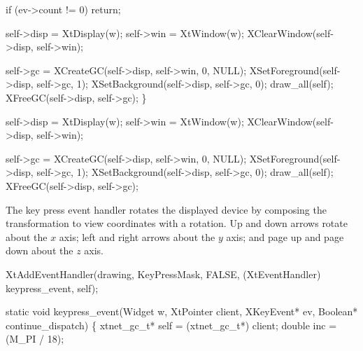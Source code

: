     if (ev->count != 0)
        return;

    self->disp = XtDisplay(w);
    self->win  = XtWindow(w);
    XClearWindow(self->disp, self->win);

    self->gc = XCreateGC(self->disp, self->win, 0, NULL);
    XSetForeground(self->disp, self->gc, 1);
    XSetBackground(self->disp, self->gc, 0);
    draw_all(self);
    XFreeGC(self->disp, self->gc);
\}

\nwendcode{}\nwdocspar

\nwenddocs{}\endmoddef\nwstartdeflinemarkup{}\nwenddeflinemarkup
self->disp = XtDisplay(w);
self->win  = XtWindow(w);
XClearWindow(self->disp, self->win);

self->gc = XCreateGC(self->disp, self->win, 0, NULL);
XSetForeground(self->disp, self->gc, 1);
XSetBackground(self->disp, self->gc, 0);
draw_all(self);
XFreeGC(self->disp, self->gc);
\nwendcode{}\nwdocspar

The key press event handler rotates the displayed device by
composing the transformation to view coordinates with a
rotation.  Up and down arrows rotate about the $x$ axis;
left and right arrows about the $y$ axis; and page up and
page down about the $z$ axis.

\nwenddocs{}\plusendmoddef\nwstartdeflinemarkup{}\nwenddeflinemarkup
XtAddEventHandler(drawing, KeyPressMask, FALSE,
                  (XtEventHandler) keypress_event, self);
\nwendcode{}\nwdocspar

\nwenddocs{}\plusendmoddef\nwstartdeflinemarkup{}\nwenddeflinemarkup
static void keypress_event(Widget w, XtPointer client, XKeyEvent* ev,
                           Boolean* continue_dispatch)
\{
    xtnet_gc_t* self = (xtnet_gc_t*) client;
    double inc = (M_PI / 18);

